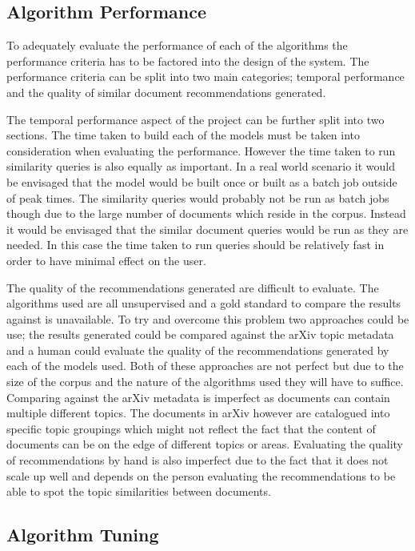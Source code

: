 \subsection{Algorithm Performance}
To adequately evaluate the performance of each of the algorithms the performance criteria has to be factored into the design of the system.
The performance criteria can be split into two main categories; temporal performance and the quality of similar document recommendations generated.

The temporal performance aspect of the project can be further split into two sections.
The time taken to build each of the models must be taken into consideration when evaluating the performance.
However the time taken to run similarity queries is also equally as important.
In a real world scenario it would be envisaged that the model would be built once or built as a batch job outside of peak times.
The similarity queries would probably not be run as batch jobs though due to the large number of documents which reside in the corpus.
Instead it would be envisaged that the similar document queries would be run as they are needed.
In this case the time taken to run queries should be relatively fast in order to have minimal effect on the user.

The quality of the recommendations generated are difficult to evaluate.
The algorithms used are all unsupervised and a gold standard to compare the results against is unavailable.
To try and overcome this problem two approaches could be use; the results generated could be compared against the arXiv topic metadata and a human could evaluate the quality of the recommendations generated by each of the models used.
Both of these approaches are not perfect but due to the size of the corpus and the nature of the algorithms used they will have to suffice.
Comparing against the arXiv metadata is imperfect as documents can contain multiple different topics.
The documents in arXiv however are catalogued into specific topic groupings which might not reflect the fact that the content of documents can be on the edge of different topics or areas.
Evaluating the quality of recommendations by hand is also imperfect due to the fact that it does not scale up well and depends on the person evaluating the recommendations to be able to spot the topic similarities between documents.

\subsection{Algorithm Tuning}

